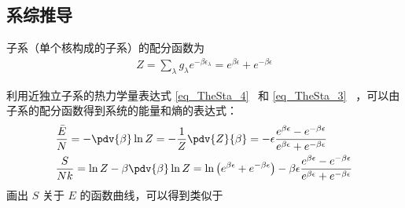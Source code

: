 \subsection{系综推导}
子系（单个核构成的子系）的配分函数为
\begin{equation}
\begin{aligned}
Z=\sum_{\lambda}g_\lambda e^{-\beta \epsilon_\lambda}=e^{\beta \epsilon } +e^{-\beta \epsilon}
\end{aligned}
\end{equation}

利用近独立子系的热力学量表达式 \autoref{eq_TheSta_4}~ 和 \autoref{eq_TheSta_3}~ ，可以由子系的配分函数得到系统的能量和熵的表达式：
\begin{equation}
\begin{aligned}
&\frac{\bar E}{N}=-\pdv{\beta} \ln Z=-\frac{1}{Z}\pdv{Z}{\beta}
=-\epsilon\frac{e^{\beta\epsilon}-e^{-\beta\epsilon}}{e^{\beta\epsilon}+e^{-\beta\epsilon}}\\
&\frac{S}{Nk}
=\ln Z-\beta\pdv{\beta} \ln Z=
\ln \left(e^{\beta\epsilon}+e^{-\beta\epsilon}\right)-
\beta\epsilon \frac{e^{\beta\epsilon}-e^{-\beta\epsilon}}{e^{\beta\epsilon}+e^{-\beta\epsilon}}
\end{aligned}
\end{equation}
画出 $S$ 关于 $E$ 的函数曲线，可以得到类似于